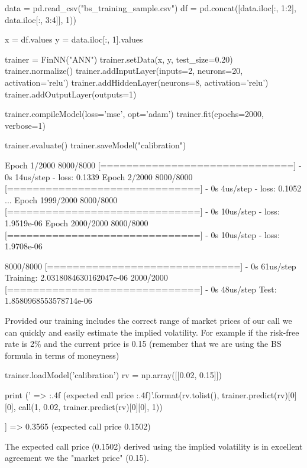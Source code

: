 \begin{ipython}
data = pd.read_csv("bs_training_sample.csv")
df = pd.concat([data.iloc[:, 1:2], data.iloc[:, 3:4]], 1))

x = df.values
y = data.iloc[:, 1].values

trainer = FinNN("ANN")
trainer.setData(x, y, test_size=0.20)
trainer.normalize()
trainer.addInputLayer(inputs=2, neurons=20, activation='relu')
trainer.addHiddenLayer(neurons=8, activation='relu')
trainer.addOutputLayer(outputs=1)

trainer.compileModel(loss='mse', opt='adam')
trainer.fit(epochs=2000, verbose=1)

trainer.evaluate()
trainer.saveModel("calibration")
\end{ipython}
\begin{ioutput}
Epoch 1/2000
8000/8000 [==============================] - 0s 14us/step - loss: 0.1339
Epoch 2/2000
8000/8000 [==============================] - 0s 4us/step - loss: 0.1052
...
Epoch 1999/2000
8000/8000 [==============================] - 0s 10us/step - loss: 1.9519e-06
Epoch 2000/2000
8000/8000 [==============================] - 0s 10us/step - loss: 1.9708e-06

8000/8000 [==============================] - 0s 61us/step
Training: 2.0318084630162047e-06
2000/2000 [==============================] - 0s 48us/step
Test: 1.8580968553578714e-06
\end{ioutput}

Provided our training includes the correct range of market prices of our call we can quickly and easily estimate the implied volatility. For example if the risk-free rate is 2\% and the current price is 0.15 (remember that we are using the BS formula in terms of moneyness)

\begin{ipython}
trainer.loadModel('calibration')
rv = np.array([[0.02, 0.15]])

print ('{} => {:.4f} (expected call price {:.4f})'.format(rv.tolist(),
                                                   trainer.predict(rv)[0][0],
                                                   call(1, 0.02, 
                                                   trainer.predict(rv)[0][0], 1))
\end{ipython}
\begin{ioutput}
[[0.02, 0.15]] => 0.3565 (expected call price 0.1502)
\end{ioutput}
\noindent
The expected call price (0.1502) derived using the implied volatility is in excellent agreement we the "market price" (0.15).

